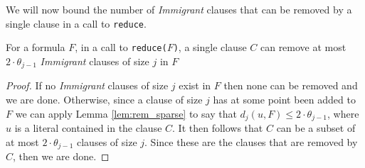 We will now bound the number of \textit{Immigrant} clauses that can be removed by a single clause
in a call to \texttt{reduce}.
\begin{lemma} \label{lem:max_remove}
    For a formula $F$, in a call to \texttt{reduce($F$)}, a single clause $C$ can remove at most
    $2 \cdot \theta_{j - 1}$ \textit{Immigrant} clauses of size $j$ in $F$
\end{lemma}
\begin{proof}
    If no \textit{Immigrant} clauses of size $j$ exist in $F$ then none can be removed and we are done.
    Otherwise, since a clause of size $j$ has at some point been added to $F$
    we can apply Lemma \ref{lem:rem_sparse} to say that $d_j(u, F) \leq 2 \cdot \theta_{j - 1}$,
    where $u$ is a literal contained in the clause $C$. It then follows that $C$ can be a
    subset of at most $2 \cdot \theta_{j-1}$ clauses of size $j$. Since these are the clauses that
    are removed by $C$, then we are done.
\end{proof}

